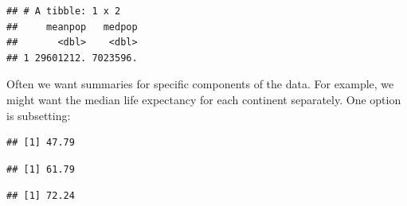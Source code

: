 \documentclass[
]{krantz}
\newenvironment{Shaded}{\begin{snugshade}}{\end{snugshade}}
\newcommand{\KeywordTok}[1]{\textcolor[rgb]{0.13,0.29,0.53}{\textbf{#1}}}
\newcommand{\NormalTok}[1]{#1}
\newcommand{\OperatorTok}[1]{\textcolor[rgb]{0.81,0.36,0.00}{\textbf{#1}}}
\newcommand{\StringTok}[1]{\textcolor[rgb]{0.31,0.60,0.02}{#1}}
\begin{document}
\begin{verbatim}
## # A tibble: 1 x 2
##     meanpop   medpop
##       <dbl>    <dbl>
## 1 29601212. 7023596.
\end{verbatim}

Often we want summaries for specific components of the data. For example, we might want the median life expectancy for each continent separately. One option is subsetting:

\begin{Shaded}
\end{Shaded}

\begin{verbatim}
## [1] 47.79
\end{verbatim}

\begin{Shaded}
\end{Shaded}

\begin{verbatim}
## [1] 61.79
\end{verbatim}

\begin{Shaded}
\end{Shaded}

\begin{verbatim}
## [1] 72.24
\end{verbatim}

\begin{Shaded}
\end{Shaded}
\end{document}
